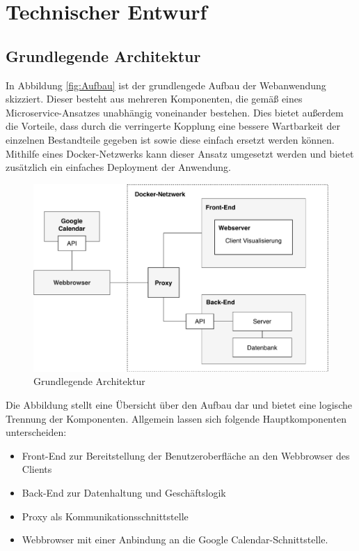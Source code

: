 \section{Technischer Entwurf}
\subsection{Grundlegende Architektur}
\label{ch:grundlegendeArchitektur}
In Abbildung \vref{fig:Aufbau} ist der grundlengede Aufbau der Webanwendung skizziert.
Dieser besteht aus mehreren Komponenten, die gemäß eines Microservice-Ansatzes unabhängig voneinander bestehen. 
Dies bietet außerdem die Vorteile, dass durch die verringerte Kopplung eine bessere Wartbarkeit der einzelnen Bestandteile gegeben ist sowie diese einfach ersetzt werden können. 
Mithilfe eines Docker-Netzwerks kann dieser Ansatz umgesetzt werden und bietet zusätzlich ein einfaches Deployment der Anwendung. 

\begin{figure}[H]
	\centering 
	\includegraphics[width=13cm]{img/TechnischerEntwurf.pdf}
	\caption[Grundlegende Architektur]{\label{fig:Aufbau}Grundlegende Architektur}
\end{figure}

Die Abbildung stellt eine Übersicht über den Aufbau dar und bietet eine logische Trennung der Komponenten. 
Allgemein lassen sich folgende Hauptkomponenten unterscheiden:
\begin{itemize}
    \item Front-End zur Bereitstellung der Benutzeroberfläche an den Webbrowser des Clients 
    \item Back-End zur Datenhaltung und Geschäftslogik
    \item Proxy als Kommunikationsschnittstelle
    \item Webbrowser mit einer Anbindung an die Google Calendar-Schnittstelle.
\end{itemize} 

